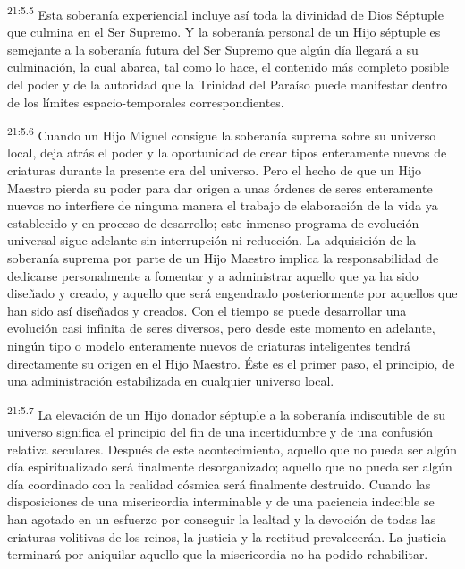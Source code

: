 \par
\textsuperscript{21:5.5} Esta soberanía experiencial incluye así toda la divinidad de Dios Séptuple que culmina en el Ser Supremo. Y la soberanía personal de un Hijo séptuple es semejante a la soberanía futura del Ser Supremo que algún día llegará a su culminación, la cual abarca, tal como lo hace, el contenido más completo posible del poder y de la autoridad que la Trinidad del Paraíso puede manifestar dentro de los límites espacio-temporales correspondientes.

\par
\textsuperscript{21:5.6} Cuando un Hijo Miguel consigue la soberanía suprema sobre su universo local, deja atrás el poder y la oportunidad de crear tipos enteramente nuevos de criaturas durante la presente era del universo. Pero el hecho de que un Hijo Maestro pierda su poder para dar origen a unas órdenes de seres enteramente nuevos no interfiere de ninguna manera el trabajo de elaboración de la vida ya establecido y en proceso de desarrollo; este inmenso programa de evolución universal sigue adelante sin interrupción ni reducción. La adquisición de la soberanía suprema por parte de un Hijo Maestro implica la responsabilidad de dedicarse personalmente a fomentar y a administrar aquello que ya ha sido diseñado y creado, y aquello que será engendrado posteriormente por aquellos que han sido así diseñados y creados. Con el tiempo se puede desarrollar una evolución casi infinita de seres diversos, pero desde este momento en adelante, ningún tipo o modelo enteramente nuevos de criaturas inteligentes tendrá directamente su origen en el Hijo Maestro. Éste es el primer paso, el principio, de una administración estabilizada en cualquier universo local.

\par
\textsuperscript{21:5.7} La elevación de un Hijo donador séptuple a la soberanía indiscutible de su universo significa el principio del fin de una incertidumbre y de una confusión relativa seculares. Después de este acontecimiento, aquello que no pueda ser algún día espiritualizado será finalmente desorganizado; aquello que no pueda ser algún día coordinado con la realidad cósmica será finalmente destruido. Cuando las disposiciones de una misericordia interminable y de una paciencia indecible se han agotado en un esfuerzo por conseguir la lealtad y la devoción de todas las criaturas volitivas de los reinos, la justicia y la rectitud prevalecerán. La justicia terminará por aniquilar aquello que la misericordia no ha podido rehabilitar.

